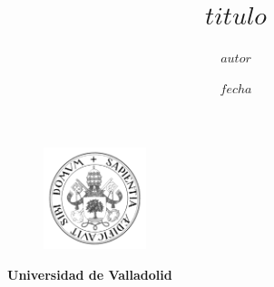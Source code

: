 \documentclass[openright,twoside,10pt]{book}
\date{$fecha$}
\author{$autor$}
\title{$titulo$}
\begin{document}
    {
        \selectfont
        \begin{titlepage}
        \begin{center}
            \vspace*{-1in}
            \begin{figure}[htb]
                \begin{center}
                    \includegraphics[width=3cm]{./latex/img/logo}
                \end{center}
            \end{figure}
            \begin{Large}
                \textbf{Universidad de Valladolid}
            \end{Large}


\end{center}
\end{titlepage}}
\end{document}
